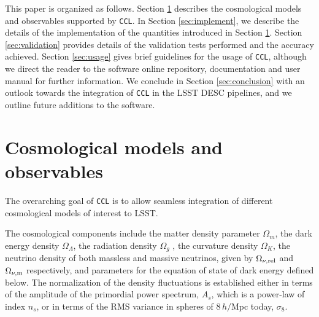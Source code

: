 \documentclass[\docopts]{\docclass}
\newcommand{\ccl}{{\tt CCL}\xspace}
\begin{document}
This paper is organized as follows. Section \ref{sec:models} describes the cosmological models and observables supported by \ccl. In Section \ref{sec:implement}, we describe the details of the implementation of the quantities introduced in Section \ref{sec:models}. Section \ref{sec:validation} provides details of the validation tests performed and the accuracy achieved. Section \ref{sec:usage} gives brief guidelines for the usage of \ccl, although we direct the reader to the software online repository, documentation and user manual for further information. We conclude in Section \ref{sec:conclusion} with an outlook towards the integration of \ccl in the LSST DESC pipelines, and we outline future additions to the software. 


\section{Cosmological models and observables}
\label{sec:models}

The overarching goal of \ccl is to allow seamless integration of different cosmological models of interest to LSST.

The cosmological components include the matter density parameter $\Omega_m$, the dark energy density $\Omega_\Lambda$, the radiation density $\Omega_g$ , the curvature density $\Omega_K$, the neutrino density of both massless and massive neutrinos, given by $\Omega_{\nu, {\rm rel}}$ and $\Omega_{\nu, {\rm m}}$ respectively, and parameters for the equation of state of dark energy defined below. The normalization of the density fluctuations is established either in terms of the amplitude of the primordial power spectrum, $A_s$, which is a power-law of index $n_s$, or in terms of the RMS variance in spheres of $8\,h/$Mpc today, $\sigma_8$. 
\end{document}
